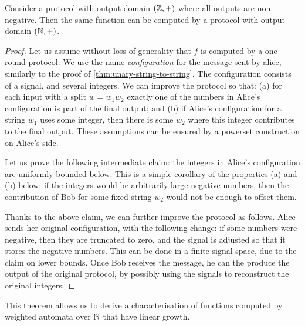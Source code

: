 
\begin{theorem}
  \label{thm:string-to-number-protocols-nat}
  Consider a protocol with output domain $({\mathbb Z},+)$ where all outputs are non-negative. Then the same function can be computed by a protocol with output domain $({\mathbb N},+)$.
\end{theorem}
\begin{proof}
  Let us assume without loss of generality that $f$ is computed by a one-round
  protocol.  We use the name \emph{configuration} for the message sent by alice, similarly to the proof of \cref{thm:unary-string-to-string}. The configuration consists of a signal, and several integers. We can improve the protocol so that:  (a) for each input with a split $w = w_1 w_2$ exactly one of the numbers in Alice's configuration is part of the  final output; and (b) if Alice's configuration for a string $w_1$ uses some integer, then  there is some $w_2$ where this integer contributes to the final output.  These assumptions can be ensured by a powerset
  construction on Alice's side.

  Let us prove the following intermediate claim: the integers in  Alice's configuration are
  uniformly bounded below. This is a simple corollary of the properties (a) and (b) below: if the integers would be arbitrarily large negative numbers, then the contribution of Bob for some fixed string $w_2$ would not be enough to offset them. 


  Thanks to the above claim, we can further improve the protocol as follows. Alice sends her original configuration, with the following change: if some numbers were negative, then they are truncated to zero, and the signal is adjusted so that it stores the negative numbers. This can be done in a finite signal space, due to the claim on lower bounds. Once Bob receives the message, he can the produce the output of the original protocol, by possibly using the signals to reconstruct the original integers.
\end{proof}

This theorem allows us to derive a characterisation of functions 
computed by weighted automata over ${\mathbb N}$ that have linear growth.

